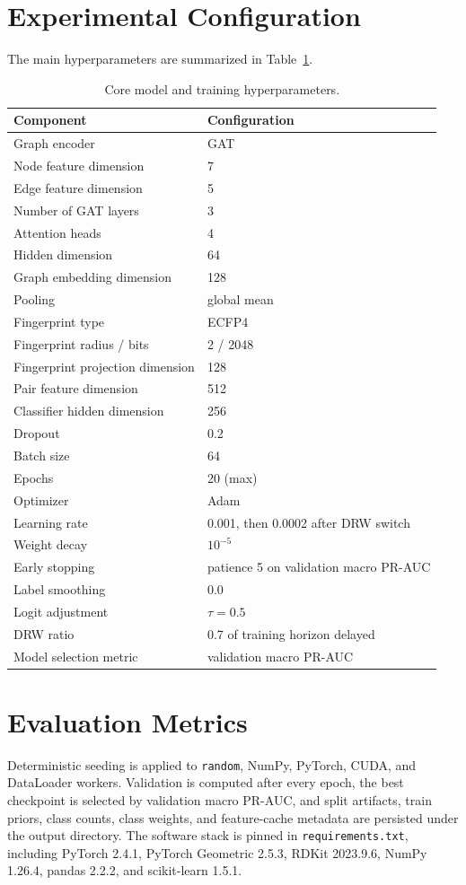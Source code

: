 \documentclass[12pt,a4paper]{report}
\begin{document}
\section{Experimental Configuration}
The main hyperparameters are summarized in Table~\ref{tab:hyperparams}.

\begin{table}[H]
\centering
\caption{Core model and training hyperparameters.}
\label{tab:hyperparams}
\begin{tabular}{ll}
\toprule
Component & Configuration \\
\midrule
Graph encoder & GAT \\
Node feature dimension & 7 \\
Edge feature dimension & 5 \\
Number of GAT layers & 3 \\
Attention heads & 4 \\
Hidden dimension & 64 \\
Graph embedding dimension & 128 \\
Pooling & global mean \\
Fingerprint type & ECFP4 \\
Fingerprint radius / bits & 2 / 2048 \\
Fingerprint projection dimension & 128 \\
Pair feature dimension & 512 \\
Classifier hidden dimension & 256 \\
Dropout & 0.2 \\
Batch size & 64 \\
Epochs & 20 (max) \\
Optimizer & Adam \\
Learning rate & 0.001, then 0.0002 after DRW switch \\
Weight decay & \(10^{-5}\) \\
Early stopping & patience 5 on validation macro PR-AUC \\
Label smoothing & 0.0 \\
Logit adjustment & \(\tau = 0.5\) \\
DRW ratio & 0.7 of training horizon delayed \\
Model selection metric & validation macro PR-AUC \\
\bottomrule
\end{tabular}
\end{table}

\section{Evaluation Metrics}
Deterministic seeding is applied to \texttt{random}, NumPy, PyTorch, CUDA, and DataLoader workers. Validation is computed after every epoch, the best checkpoint is selected by validation macro PR-AUC, and split artifacts, train priors, class counts, class weights, and feature-cache metadata are persisted under the output directory. The software stack is pinned in \texttt{requirements.txt}, including PyTorch 2.4.1, PyTorch Geometric 2.5.3, RDKit 2023.9.6, NumPy 1.26.4, pandas 2.2.2, and scikit-learn 1.5.1.
\end{document}
